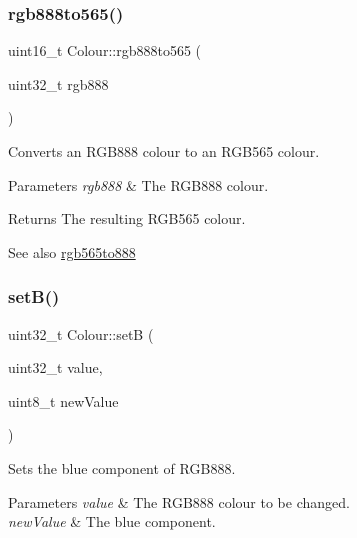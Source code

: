 \subsubsection{\texorpdfstring{rgb888to565()}{rgb888to565()}}
{\footnotesize\ttfamily uint16\+\_\+t Colour\+::rgb888to565 (\begin{DoxyParamCaption}\item[{uint32\+\_\+t}]{rgb888 }\end{DoxyParamCaption})}



Converts an R\+G\+B888 colour to an R\+G\+B565 colour. 


\begin{DoxyParams}{Parameters}
{\em rgb888} & The R\+G\+B888 colour. \\
\hline
\end{DoxyParams}
\begin{DoxyReturn}{Returns}
The resulting R\+G\+B565 colour. 
\end{DoxyReturn}
\begin{DoxySeeAlso}{See also}
\mbox{\hyperlink{namespaceColour_aa7b3de65f5d56d88b13863de9aa5641a}{rgb565to888}} 
\end{DoxySeeAlso}
\mbox{\label{namespaceColour_a0b181bcc3bc52f87504d8f1cf3d0289a}} 
\subsubsection{\texorpdfstring{set\+B()}{setB()}}
{\footnotesize\ttfamily uint32\+\_\+t Colour\+::setB (\begin{DoxyParamCaption}\item[{uint32\+\_\+t}]{value,  }\item[{uint8\+\_\+t}]{new\+Value }\end{DoxyParamCaption})}



Sets the blue component of R\+G\+B888. 


\begin{DoxyParams}{Parameters}
{\em value} & The R\+G\+B888 colour to be changed. \\
\hline
{\em new\+Value} & The blue component. \\
\hline
\end{DoxyParams}
\mbox{\label{namespaceColour_a059504956471e6a07df579f59cec6e22}} 
